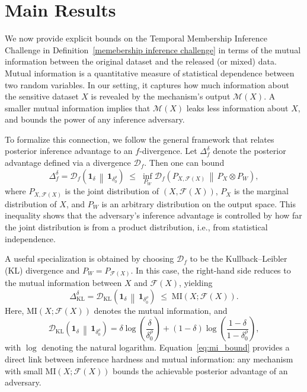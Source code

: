 \documentclass[letterpaper]{article} %
\begin{document}
\section{Main Results}
\label{sec:main_results}
We now provide explicit bounds on the Temporal Membership Inference Challenge in Definition~\ref{memebership inference challenge} in terms of the mutual information between the original dataset and the released (or mixed) data. Mutual information is a quantitative measure of statistical dependence between two random variables. In our setting, it captures how much information about the sensitive dataset $X$ is revealed by the mechanism's output $\mathcal{M}(X)$. A smaller mutual information implies that $\mathcal{M}(X)$ leaks less information about $X$, and bounds the power of any inference adversary.

To formalize this connection, we follow the general framework that relates posterior inference advantage to an $f$-divergence. Let $\Delta_f^\delta$ denote the posterior advantage defined via a divergence $\mathcal{D}_f$. Then one can bound
\begin{equation}\label{eq:general_f_bound}
\Delta_f^\delta 
= 
\mathcal{D}_f\!\left( 
    \mathbf{1}_\delta \,\middle\|\, \mathbf{1}_{\delta_0^\rho}
\right)
\;\le\;
\inf_{P_W} 
\mathcal{D}_f\!\left(
    P_{X,\mathcal{F}(X)} 
    \,\middle\|\,
    P_X \otimes P_W
\right),
\end{equation}
where $P_{X,\mathcal{F}(X)}$ is the joint distribution of $(X,\mathcal{F}(X))$, $P_X$ is the marginal distribution of $X$, and $P_W$ is an arbitrary distribution on the output space. This inequality shows that the adversary's inference advantage is controlled by how far the joint distribution is from a product distribution, i.e., from statistical independence.

A useful specialization is obtained by choosing $\mathcal{D}_f$ to be the Kullback--Leibler (KL) divergence and $P_W = P_{\mathcal{F}(X)}$. In this case, the right-hand side reduces to the mutual information between $X$ and $\mathcal{F}(X)$, yielding
\begin{equation}\label{eq:mi_bound}
\Delta_{\mathrm{KL}}^\delta
=
\mathcal{D}_{\mathrm{KL}}\!\left(
    \mathbf{1}_\delta 
    \,\middle\|\,
    \mathbf{1}_{\delta_0^\rho}
\right)
\;\le\;
\mathrm{MI}\!\left(X;\mathcal{F}(X)\right).
\end{equation}
Here, $\mathrm{MI}(X;\mathcal{F}(X))$ denotes the mutual information, and
\[
\mathcal{D}_{\mathrm{KL}}\!\left(
    \mathbf{1}_\delta 
    \,\middle\|\,
    \mathbf{1}_{\delta_0^\rho}
\right)
=
\delta \log\!\left(\frac{\delta}{\delta_0^\rho}\right)
+
(1-\delta)\log\!\left(
    \frac{1-\delta}{1-\delta_0^\rho}
\right),
\]
with $\log$ denoting the natural logarithm. Equation~\eqref{eq:mi_bound} provides a direct link between inference hardness and mutual information: any mechanism with small $\mathrm{MI}(X;\mathcal{F}(X))$ bounds the achievable posterior advantage of an adversary.
\end{document}
